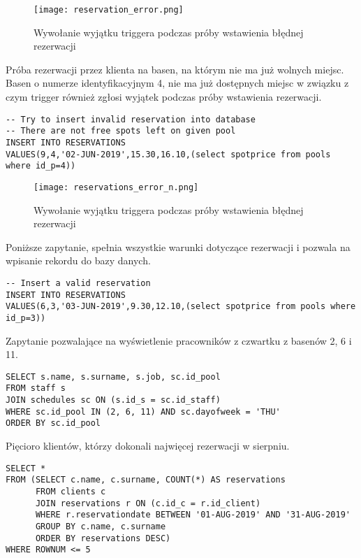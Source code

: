 \documentclass[a4paper]{article}
\newcounter{subsubsubsection}[subsubsection]
\begin{document}
\newpage

\begin{figure}[h!]
\centering
\texttt{[image: reservation\_error.png]}
\caption{Wywołanie wyjątku triggera podczas próby wstawienia błędnej rezerwacji}
\end{figure}

\noindent   
Próba rezerwacji przez klienta na basen, na którym nie ma już wolnych miejsc. Basen o numerze identyfikacyjnym 4, nie ma już dostępnych miejsc w związku z czym trigger również zgłosi wyjątek podczas próby wstawienia rezerwacji.

\begin{verbatim}
-- Try to insert invalid reservation into database
-- There are not free spots left on given pool
INSERT INTO RESERVATIONS
VALUES(9,4,'02-JUN-2019',15.30,16.10,(select spotprice from pools where id_p=4))
\end{verbatim}

\begin{figure}[h!]
\centering
\texttt{[image: reservations\_error\_n.png]}
\caption{Wywołanie wyjątku triggera podczas próby wstawienia błędnej rezerwacji}
\end{figure}

\noindent
Poniższe zapytanie, spełnia wszystkie warunki dotyczące rezerwacji i pozwala na wpisanie rekordu do bazy danych.

\begin{verbatim}
-- Insert a valid reservation
INSERT INTO RESERVATIONS
VALUES(6,3,'03-JUN-2019',9.30,12.10,(select spotprice from pools where id_p=3))
\end{verbatim}


Zapytanie pozwalające na wyświetlenie pracowników z czwartku z basenów 2, 6 i 11.

\begin{verbatim}
SELECT s.name, s.surname, s.job, sc.id_pool
FROM staff s
JOIN schedules sc ON (s.id_s = sc.id_staff)
WHERE sc.id_pool IN (2, 6, 11) AND sc.dayofweek = 'THU'
ORDER BY sc.id_pool
\end{verbatim}

\noindent
Pięcioro klientów, którzy dokonali najwięcej rezerwacji w sierpniu.

\begin{verbatim}
SELECT *
FROM (SELECT c.name, c.surname, COUNT(*) AS reservations
      FROM clients c
      JOIN reservations r ON (c.id_c = r.id_client)
      WHERE r.reservationdate BETWEEN '01-AUG-2019' AND '31-AUG-2019'
      GROUP BY c.name, c.surname
      ORDER BY reservations DESC)
WHERE ROWNUM <= 5
\end{verbatim}
\end{document}
